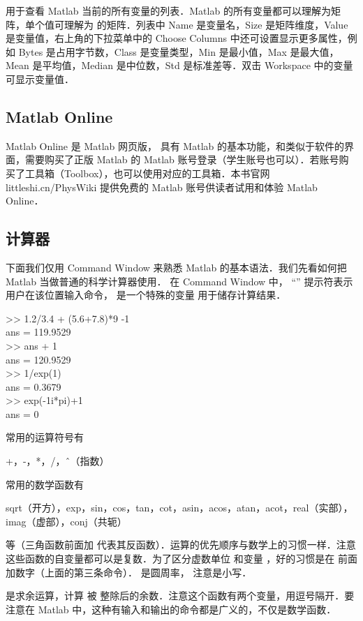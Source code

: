  用于查看 Matlab 当前的所有变量的列表．Matlab 的所有变量都可以理解为矩阵，单个值可理解为  的矩阵．列表中 Name 是变量名，Size 是矩阵维度，Value 是变量值，右上角的下拉菜单中的 Choose Columns 中还可设置显示更多属性，例如 Bytes 是占用字节数，Class 是变量类型，Min 是最小值，Max 是最大值，Mean 是平均值，Median 是中位数，Std 是标准差等．双击 Workspace 中的变量可显示变量值．

\subsection{Matlab Online}
Matlab Online 是 Matlab 网页版， 具有 Matlab 的基本功能，和类似于软件的界面，需要购买了正版 Matlab 的 Matlab 账号登录（学生账号也可以）．若账号购买了工具箱（Toolbox），也可以使用对应的工具箱．本书官网 littleshi.cn/PhysWiki 提供免费的 Matlab 账号供读者试用和体验 Matlab Online．

\subsection{计算器}
下面我们仅用 Command Window 来熟悉 Matlab 的基本语法．我们先看如何把 Matlab 当做普通的科学计算器使用． 在 Command Window 中， “\x{>>}” 提示符表示用户在该位置输入命令，  是一个特殊的变量 用于储存计算结果．
\begin{Command}
>> 1.2/3.4 + (5.6+7.8)*9 -1 \\
ans = 119.9529 \\
>> ans + 1\\
ans = 120.9529\\
>> 1/exp(1) \\
ans = 0.3679 \\
>> exp(-1i*pi)+1 \\
ans = 0
\end{Command}
常用的运算符号有
\begin{Command}
+，-，*，/，\^\ （指数）
\end{Command}
常用的数学函数有
\begin{Command}
sqrt（开方），exp，sin，cos，tan，cot，asin，acos，atan，acot，real（实部），imag（虚部），conj（共轭）
\end{Command}
等（三角函数前面加  代表其反函数）．运算的优先顺序与数学上的习惯一样．注意这些函数的自变量都可以是复数．为了区分虚数单位  和变量 ，好的习惯是在  前面加数字（上面的第三条命令）．  是圆周率， 注意是小写．

 是求余运算，计算  被  整除后的余数．注意这个函数有两个变量，用逗号隔开．要注意在 Matlab 中，这种有输入和输出的命令都是广义的，不仅是数学函数．

